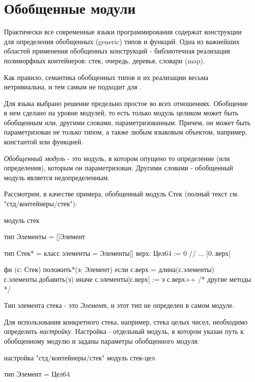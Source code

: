 \hypertarget{generic}{%
\section{Обобщенные модули}\label{generic:chapter}}

Практически все современные языки программирования содержат конструкции для определения обобщенных (generic) типов и функций.
Одна из важнейших областей применения обобщенных конструкций - библиотечная реализация полиморфных контейнеров: стек, очередь, деревья, словари (map). 

Как правило, семантика обобщенных типов и их реализации весьма нетривиальна, и тем самым не подходит для \thelang{}.

\bigskip
Для языка \thelang{} выбрано решение предельно простое во всех отношениях. 
Обобщение в нем сделано на уровне модулей, то есть только модуль целиком может быть обобщенным или, другими словами, параметризованным.
Причем, он может быть параметризован не только типом, а также любым языковым объектом, например, константой или функцией.

\emph{Обобщенный модуль} - это модуль, в котором опущено то определение (или определения), которым он параметризован. 
Другими словами - обобщенный модуль является недопределенным.

Рассмотрим, в качестве примера, обобщенный модуль Стек (полный текст см. "стд/контейнеры/стек"):
\begin{Trivil}[vspace=2pt]
модуль стек

тип Элементы = []Элемент

тип Стек* = класс {
    элементы = Элементы[] 
    верх: Цел64 := 0 // ... [0..верх[
}

фн (с: Стек) положить*(э: Элемент) {
    если с.верх = длина(с.элементы) {
        с.элементы.добавить(э)
    } иначе {
        с.элементы[с.верх] := э
    }
    с.верх++
}
/* другие методы */
\end{Trivil}

Тип элемента стека - это \emph{Элемент}, и этот тип не определен в самом модуле.

\bigskip
Для использования конкретного стека, например, стека целых чисел, необходимо определить \emph{настройку}. 
Настройка - отдельный модуль, в котором указан путь к обобщенному модулю и заданы параметры обобщенного модуля:
\begin{Trivil}[vspace=2pt]
настройка "стд/контейнеры/стек"
модуль стек-цел

тип Элемент = Цел64
\end{Trivil}

